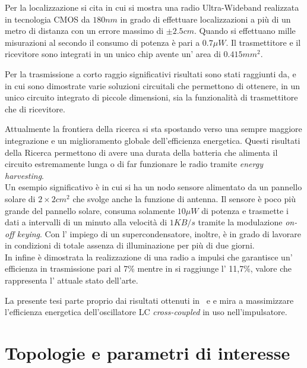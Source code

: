 \documentclass[a4paper, 12pt]{memoir}
\begin{document}
Per la localizzazione si cita\cite{Terada05} in cui si mostra una radio 
Ultra-Wideband realizzata in tecnologia CMOS da $ 180nm $ in grado di
effettuare localizzazioni a più di un metro di distanza con un errore massimo
di $ \pm 2.5cm $.
Quando si effettuano mille misurazioni al secondo il consumo di potenza è pari
a $ 0.7\mu W $. Il trasmettitore e il ricevitore sono integrati in un unico
chip avente un' area di $ 0.415mm^2 $.

Per la trasmissione a corto raggio significativi risultati sono stati raggiunti
da\cite{RabaeyEECS},\cite{Neviani12} e\cite{Gambini12} in cui sono dimostrate
varie soluzioni circuitali che permettono di ottenere, in un unico circuito
integrato di piccole dimensioni, sia la funzionalità di trasmettitore che di
ricevitore.

Attualmente la frontiera della ricerca si sta spostando verso una sempre
maggiore integrazione e un miglioramento globale dell'efficienza energetica.
Questi risultati della Ricerca permettono di avere una durata della batteria che
alimenta il circuito estremamente lunga o di far funzionare le radio tramite
\emph{energy harvesting}.\\
Un esempio significativo è\cite{Danesh11} in cui si ha un nodo sensore 
alimentato da un pannello solare di $ 2\times2 cm^2 $ che svolge anche la
funzione di antenna. Il sensore è poco più grande del pannello solare, consuma
solamente $ 10\mu W $ di potenza e trasmette i dati a intervalli di un
minuto alla velocità di $ 1 KB/s $ tramite la modulazione \emph{on-off
keying}.
Con l' impiego di un supercondensatore, inoltre, è in grado di lavorare in
condizioni di totale assenza di illuminazione per più di due giorni.\\
In\cite{Solda10} infine è dimostrata la realizzazione di una radio a impulsi 
che garantisce un' efficienza in trasmissione pari al 7\% mentre in 
\cite{Neviani14} si raggiunge l' 11,7\%, valore che rappresenta l' attuale
stato dell'arte.

La presente tesi parte proprio dai risultati ottenuti in~\cite{Neviani12} e
\cite{Neviani14} e mira a massimizzare l'efficienza energetica dell'oscillatore
LC \emph{cross-coupled} in uso nell'impulsatore.

\cleardoublepage{}
\chapter{Topologie e parametri di interesse}
\cite{Razavi11}
\end{document}
